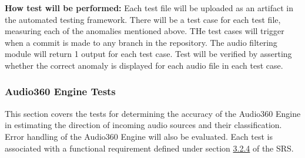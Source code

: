 \documentclass[12pt, titlepage]{article}
\begin{document}
\begin{enumerate}
\textbf{How test will be performed:}
Each test file will be uploaded as an artifact in the automated testing
framework. There will be a test case for each test file, measuring each of the
anomalies mentioned above. THe test cases will trigger when a commit is made to
any branch in the repository. The audio filtering module will return 1 output
for each test case. Test will be verified by asserting whether the correct
anomaly is displayed for each audio file in each test case. 

\end{enumerate}


\subsubsection{Audio360 Engine Tests}

This section covers the tests for determining the accuracy of the Audio360
Engine in estimating the direction of incoming audio sources and their
classification. Error handling of the Audio360 Engine will also be evaluated.
Each test is associated with a functional requirement defined under section
\hyperref[SRS-sec:FR4]{3.2.4} of the SRS. 
\end{document}
